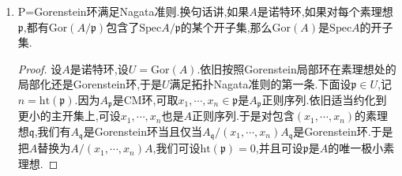 \begin{enumerate}
\begin{proof}
    	按照CM条件满足Nagata准则,归结为证明如果$A$是某个CM环$R$的商并且$A$是整环,那么$\mathrm{CM}(A)$包含了$\mathrm{Spec}A$的某个开子集.记$A=R/\mathfrak{p}$,其中$\mathfrak{p}\in\mathrm{Spec}R$.因为$R$是CM环,可取$R_{\mathfrak{p}}$正则序列$x_1,\cdots,x_n\in\mathfrak{p}$,其中$n=\mathrm{ht}(\mathfrak{p})$.适当限制在主开集上,我们不妨设$x_1,\cdots,x_n$也是$R$正则序列,并且$I=(x_1,\cdots,x_n)R$是$\mathfrak{p}$准素理想.特别的此时$R/I$也是CM环,于是用$R/I$替换$R$,我们不妨设$\mathrm{ht}(\mathfrak{p})=0$,并且$(0)$是$\mathfrak{p}$准素理想.于是$\mathfrak{p}$是幂零理想,记正整数$s$使得$\mathfrak{p}^s=0$.和上面证明一样,适当限制在更小的主开集上可以保证$\mathfrak{p}^i/\mathfrak{p}^{i+1}$都是$R/\mathfrak{p}$有限自由模.取$\mathfrak{q}\in V(\mathfrak{p})=\mathrm{Spec}(R)$.按照上面引理,有$R_{\mathfrak{q}}$和$R_{\mathfrak{q}}/\mathfrak{p}R_{\mathfrak{q}}$具有相同深度,于是$R_{\mathfrak{q}}$是CM环得到$A_{\mathfrak{q}/\mathfrak{p}}=R_{\mathfrak{q}}/\mathfrak{p}R_{\mathfrak{q}}$也是CM环.于是此时$A$本身就是CM环,于是$U=\mathrm{CM}(A)=\mathrm{Spec}A$是开集.
    \end{proof}
    \item P=Gorenstein环满足Nagata准则.换句话讲,如果$A$是诺特环,如果对每个素理想$\mathfrak{p}$,都有$\mathrm{Gor}(A/\mathfrak{p})$包含了$\mathrm{Spec}A/\mathfrak{p}$的某个开子集,那么$\mathrm{Gor}(A)$是$\mathrm{Spec}A$的开子集.
    \begin{proof}
    	
    	设$A$是诺特环,设$U=\mathrm{Gor}(A)$.依旧按照Gorenstein局部环在素理想处的局部化还是Gorenstein环,于是$U$满足拓扑Nagata准则的第一条.下面设$\mathfrak{p}\in U$,记$n=\mathrm{ht}(\mathfrak{p})$.因为$A_{\mathfrak{p}}$是CM环,可取$x_1,\cdots,x_n\in\mathfrak{p}$是$A_{\mathfrak{p}}$正则序列.依旧适当约化到更小的主开集上,可设$x_1,\cdots,x_n$也是$A$正则序列.于是对包含$(x_1,\cdots,x_n)$的素理想$\mathfrak{q}$,我们有$A_{\mathfrak{q}}$是Gorenstein环当且仅当$A_{\mathfrak{q}}/(x_1,\cdots,x_n)A_{\mathfrak{q}}$是Gorenstein环.于是把$A$替换为$A/(x_1,\cdots,x_n)A$,我们可设$\mathrm{ht}(\mathfrak{p})=0$,并且可设$\mathfrak{p}$是$A$的唯一极小素理想.
    	
    	\qquad
    	

\end{proof}
\end{enumerate}
